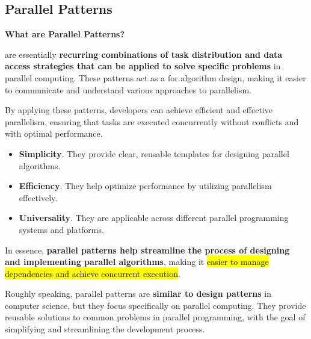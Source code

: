 \subsection{Parallel Patterns}

\begin{flushleft}
    \textcolor{Green3}{ \textbf{What are Parallel Patterns?}}
\end{flushleft}
 are essentially \textbf{recurring combinations of task distribution and data access strategies that can be applied to solve specific problems} in parallel computing. These patterns act as a  for algorithm design, making it easier to communicate and understand various approaches to parallelism. 

\highspace
By applying these patterns, developers can achieve efficient and effective parallelism, ensuring that tasks are executed concurrently without conflicts and with optimal performance. 
\begin{itemize}[label=\textcolor{Green3}{}]
    \item \textcolor{Green3}{\textbf{Simplicity}}. They provide clear, reusable templates for designing parallel algorithms.
    \item \textcolor{Green3}{\textbf{Efficiency}}. They help optimize performance by utilizing parallelism effectively.
    \item \textcolor{Green3}{\textbf{Universality}}. They are applicable across different parallel programming systems and platforms.
\end{itemize}
In essence, \textbf{parallel patterns help streamline the process of designing and implementing parallel algorithms}, making it \hl{easier to manage dependencies and achieve concurrent execution}.

\highspace
Roughly speaking, parallel patterns are \textbf{similar to design patterns} in computer science, but they focus specifically on parallel computing. They provide reusable solutions to common problems in parallel programming, with the goal of simplifying and streamlining the development process.

